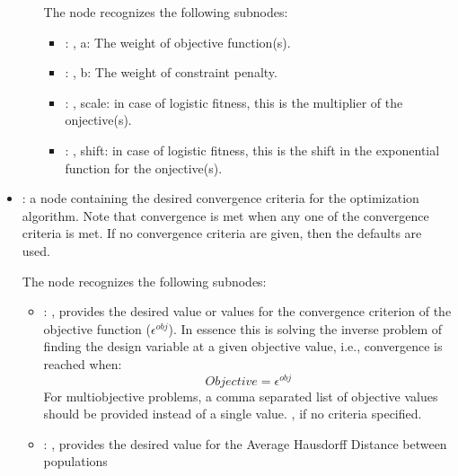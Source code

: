 \begin{itemize}
\begin{itemize}
          The  node recognizes the following subnodes:
          \begin{itemize}
            \item {}: ,
              a: The weight of objective function(s). 

            \item {}: ,
              b: The weight of constraint penalty. 

            \item {}: ,
              scale: in case of logistic fitness, this is the multiplier of the onjective(s).

            \item {}: ,
              shift: in case of logistic fitness, this is the shift in the exponential function for
              the onjective(s). 
          \end{itemize}
      \end{itemize}

    \item {}:
      a node containing the desired convergence criteria for the optimization algorithm.
      Note that convergence is met when any one of the convergence criteria is met. If no
      convergence               criteria are given, then the defaults are used.

      The  node recognizes the following subnodes:
      \begin{itemize}
        \item {}: ,
          provides the desired value or values for the convergence criterion of the objective
          function                        ($\epsilon^{obj}$). In essence this is solving the inverse
          problem of finding the design variable                         at a given objective value,
          i.e., convergence is reached when: $$ Objective = \epsilon^{obj}$$
          For multiobjective problems, a comma separated list of objective
          values should be provided instead of a single value.
          , if no criteria specified.

        \item {}: ,
          provides the desired value for the Average Hausdorff Distance between populations


\end{itemize}
\end{itemize}
